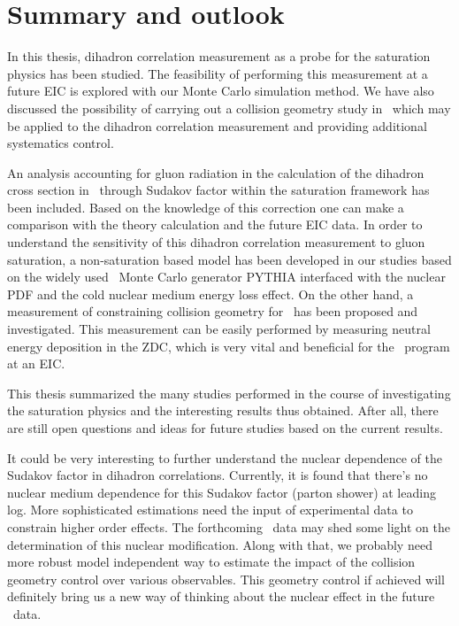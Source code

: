 \chapter{Summary and outlook} \label{chp:summary}

In this thesis, dihadron correlation measurement as a probe for the saturation
physics has been studied. The feasibility of performing this measurement at a
future EIC is explored with our Monte Carlo simulation method. We have also
discussed the possibility of carrying out a collision geometry study in \eA\,
which may be applied to the dihadron correlation measurement and providing
additional systematics control.

An analysis accounting for gluon radiation in the calculation of the dihadron
cross section in \eA\ through Sudakov factor within the saturation framework has
been included. Based on the knowledge of this correction one can make a
comparison with the theory calculation and the future EIC data. In order to
understand the sensitivity of this dihadron correlation measurement to gluon
saturation, a non-saturation based model has been developed in our studies based
on the widely used \ep\ Monte Carlo generator PYTHIA interfaced with the nuclear
PDF and the cold nuclear medium energy loss effect. On the other hand, a
measurement of constraining collision geometry for \eA\ has been proposed and
investigated. This measurement can be easily performed by measuring neutral
energy deposition in the ZDC, which is very vital and beneficial for the \eA\ program at an EIC. 

This thesis summarized the many studies performed in the course of investigating
the saturation physics and the interesting results thus obtained. After all, there
are still open questions and ideas for future studies based on the current
results.

It could be very interesting to further understand the nuclear dependence of the
Sudakov factor in dihadron correlations. Currently, it is found that there's no
nuclear medium dependence for this Sudakov factor (parton shower) at leading
log. More sophisticated estimations need the input of experimental data to
constrain higher order effects. The forthcoming \pA\ data may shed some light on
the determination of this nuclear modification. Along with that, we probably
need more robust model independent way to estimate the impact of the collision
geometry control over various observables. This geometry control if achieved
will definitely bring us a new way of thinking about the nuclear effect in the
future \eA\ data.
